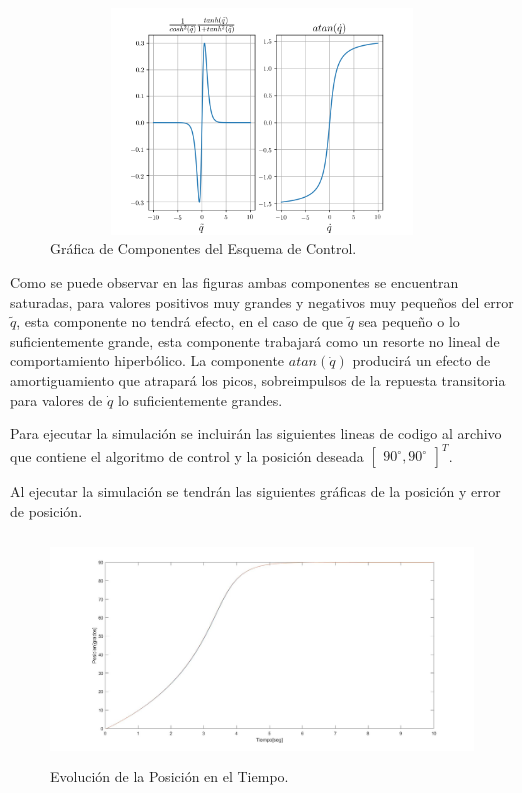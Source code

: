\documentclass[12pt]{article}
\begin{document}
\begin{enumerate}
    \vspace{15mm}

    \begin{figure}[h]
        \centering
        \includegraphics[width=14cm, height=6cm]{IMAGENES/comportamiento.png}
        \caption{Gráfica de Componentes del Esquema de Control.}
        \label{fig:comportamiento}
    \end{figure}
    
    Como se puede observar en las figuras ambas componentes se encuentran saturadas, para valores positivos muy grandes y negativos muy pequeños del error $\tilde{q}$, esta componente no tendrá efecto, en el caso de que $\tilde{q}$ sea pequeño o lo suficientemente grande, esta componente trabajará como un resorte no lineal de comportamiento hiperbólico. La componente $atan(\dot{q})$ producirá un efecto de amortiguamiento que atrapará los picos, sobreimpulsos de la repuesta transitoria para valores de $\dot{q}$ lo suficientemente grandes. 

    Para ejecutar la simulación se incluirán las siguientes lineas de codigo al archivo que contiene el algoritmo de control y la posición deseada $\begin{bmatrix}
        90^\circ,90^\circ
    \end{bmatrix}^T$.
    
    Al ejecutar la simulación se tendrán las siguientes gráficas de la posición y error de posición.
    \begin{figure}[h]
        \centering
        \includegraphics[width=14cm, height=6cm]{IMAGENES/pos.jpg}
        \caption{Evolución de la Posición en el Tiempo.}
        \label{fig:position}
    \end{figure}


\end{enumerate}
\end{document}
